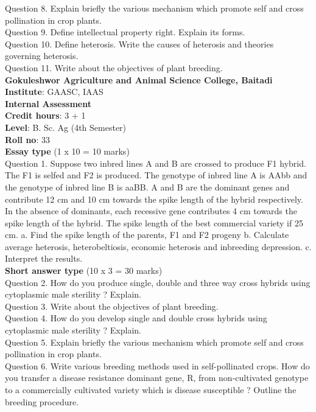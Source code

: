 \documentclass[12pt]{article}\usepackage[]{graphicx}\usepackage[]{color}
\begin{document}
Question 8. Explain briefly the various mechanism which promote self and cross pollination in crop plants.\\
Question 9. Define intellectual property right. Explain its forms.\\
Question 10. Define heterosis. Write the causes of heterosis and theories governing heterosis.\\
Question 11. Write about the objectives of plant breeding.\\
\clearpage 
{\centering \Large{\textbf{Gokuleshwor Agriculture and Animal Science College, Baitadi}} \\[0.25cm]
            \textbf{Institute}: GAASC, IAAS \\[0.2cm]
            \textbf{Internal Assessment} \\[0.2cm]} 
\textbf{Credit hours}: 3 + 1 \\ 
\textbf{Level}: B. Sc. Ag (4th Semester) \\
\textbf{Roll no}: 33 \\[0.5cm] 
\textbf{Essay type} (1 x 10 = 10 marks) \\
Question 1. Suppose two inbred lines A and B are crossed to produce F1 hybrid. The F1 is selfed and F2 is produced. The genotype of inbred line A is AAbb and the genotype of inbred line B is aaBB. A and B are the dominant genes and contribute 12 cm and 10 cm towards the spike length of the hybrid respectively. In the absence of dominants, each recessive gene contributes 4 cm towards the spike length of the hybrid. The spike length of the best commercial variety if 25 cm. a. Find the spike length of the parents, F1 and F2 progeny b. Calculate average heterosis, heterobeltiosis, economic heterosis and inbreeding depression. c. Interpret the results.\\
\textbf{Short answer type} (10 x 3 = 30 marks) \\
Question 2. How do you produce single, double and three way cross hybrids using cytoplasmic male sterility ? Explain.\\
Question 3. Write about the objectives of plant breeding.\\
Question 4. How do you develop single and double cross hybrids using cytoplasmic male sterility ? Explain.\\
Question 5. Explain briefly the various mechanism which promote self and cross pollination in crop plants.\\
Question 6. Write various breeding methods used in self-pollinated crops. How do you transfer a disease resistance dominant gene, R, from non-cultivated genotype to a commercially cultivated variety which is disease susceptible ? Outline the breeding procedure.\\
\end{document}
